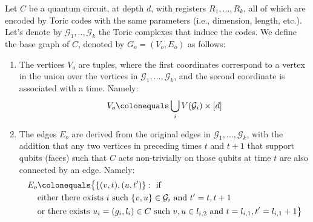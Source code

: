   \begin{definition}
    Let $C$ be a quantum circuit, at depth $d$, with registers $R_{1}, \ldots, R_{k}$, all of which are encoded by Toric codes with the same parameters (i.e., dimension, length, etc.). Let's denote by $\mathcal{G}_{1}, .., \mathcal{G}_{k}$ the Toric complexes that induce the codes. We define the base graph of $C$, denoted by $G_{o} = (V_{o},E_{o})$ as follows: 
    \begin{enumerate}
      \item The vertices $V_{o}$ are tuples, where the first coordinates correspond to a vertex in the union over the vertices in $\mathcal{G}_{1}, \ldots, \mathcal{G}_{k}$, and the second coordinate is associated with a time. Namely:
        \begin{equation*}
          \begin{split}
            V_{o} \colonequals \bigcup_{i} V(\mathcal{G}_{i}) \times [d]
          \end{split}
        \end{equation*}
      \item The edges $E_{o}$ are derived from the original edges in $\mathcal{G}_{1}, \ldots, \mathcal{G}_{k}$, with the addition that any two vertices in preceding times $t$ and $t+1$ that support qubits (faces) such that $C$ acts non-trivially on those qubits at time $t$ are also connected by an edge. Namely:
        \begin{equation*}
          \begin{split}
            E_{o} & \colonequals \big\{ \{(v,t), (u,t^{\prime}) \} :  \text{ if }     \\ 
              & \text{either there exists } i \text{ such }  \{v,u\} \in \mathcal{G}_{i} \text{ and } t^{\prime} = t,t+1 \\
             & \text{or there exists } u_i = (g_{i},l_{i}) \in C \text{ such }  v,u \in l_{i,2} \text{ and } t = l_{i,1}, t^{\prime} = l_{i,1}+1  \big\} 
          \end{split}
        \end{equation*}
    \end{enumerate} 

  \end{definition}

